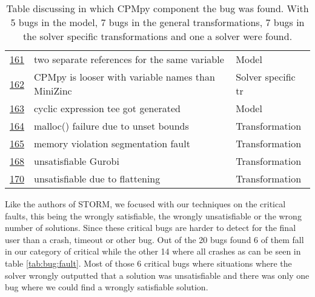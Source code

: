 \begin{table}[]
\begin{tabular}{lll}
		\href{https://github.com/CPMpy/cpmpy/issues/161}{161}   & two separate references for the same variable           & Model            \\
		\href{https://github.com/CPMpy/cpmpy/issues/162}{162}   & CPMpy is looser with variable names than MiniZinc       & Solver specific tr           \\
		\href{https://github.com/CPMpy/cpmpy/issues/163}{163}   & cyclic expression tee got generated                     & Model            \\
		\href{https://github.com/CPMpy/cpmpy/issues/164}{164}   & malloc() failure due to unset bounds                    & Transformation   \\
		\href{https://github.com/CPMpy/cpmpy/issues/165}{165}   & memory violation segmentation fault                     & Transformation   \\
		\href{https://github.com/CPMpy/cpmpy/issues/168}{168}   & unsatisfiable Gurobi                                    & Transformation   \\
		\href{https://github.com/CPMpy/cpmpy/issues/170}{170}   & unsatisfiable due to flattening                         & Transformation   \\ \bottomrule        
	\end{tabular}
	\caption{Table discussing in which CPMpy component the bug was found. With 5 bugs in the model, 7 bugs in the general transformations, 7 bugs in the solver specific transformations and one a solver were found.}
	\label{tab:bug:placeComponent}
\end{table}

Like the authors of STORM, we focused with our techniques on the critical faults, this being the wrongly satisfiable, the wrongly unsatisfiable or the wrong number of solutions. Since these critical bugs are harder to detect for the final user than a crash, timeout or other bug. Out of the 20 bugs found 6 of them fall in our category of critical while the other 14 where all crashes as can be seen in table \ref{tab:bug:fault}. Most of those 6 critical bugs where situations where the solver wrongly outputted that a solution was unsatisfiable and there was only one bug where we could find a wrongly satisfiable solution.

